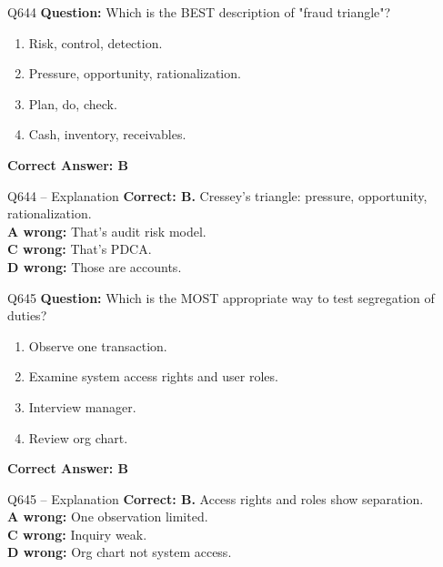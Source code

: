 \documentclass[aspectratio=169,10pt]{beamer}
\begin{document}
	\begin{frame}[t]{Q644}
		\small
		\textbf{Question:} Which is the BEST description of "fraud triangle"?
		\begin{enumerate}[label=\Alph*.,itemsep=1pt,topsep=2pt]
			\item Risk, control, detection.
			\item Pressure, opportunity, rationalization.
			\item Plan, do, check.
			\item Cash, inventory, receivables.
		\end{enumerate}
		\vspace{4pt}
		\textbf{Correct Answer: B}
	\end{frame}
	
	\begin{frame}[t]{Q644 -- Explanation}
		\small
		\textbf{Correct: B.} Cressey's triangle: pressure, opportunity, rationalization. \\[4pt]
		\textbf{A wrong:} That's audit risk model. \\[2pt]
		\textbf{C wrong:} That's PDCA. \\[2pt]
		\textbf{D wrong:} Those are accounts.
	\end{frame}
	
	\begin{frame}[t]{Q645}
		\small
		\textbf{Question:} Which is the MOST appropriate way to test segregation of duties?
		\begin{enumerate}[label=\Alph*.,itemsep=1pt,topsep=2pt]
			\item Observe one transaction.
			\item Examine system access rights and user roles.
			\item Interview manager.
			\item Review org chart.
		\end{enumerate}
		\vspace{4pt}
		\textbf{Correct Answer: B}
	\end{frame}
	
	\begin{frame}[t]{Q645 -- Explanation}
		\small
		\textbf{Correct: B.} Access rights and roles show separation. \\[4pt]
		\textbf{A wrong:} One observation limited. \\[2pt]
		\textbf{C wrong:} Inquiry weak. \\[2pt]
		\textbf{D wrong:} Org chart not system access.
	\end{frame}
	
\end{document}
